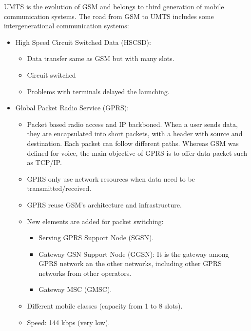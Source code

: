 \documentclass[../main.tex]{subfiles}
\begin{document}
UMTS is the evolution of GSM and belongs to third generation of mobile communication systems. The road from GSM to UMTS includes some intergenerational communication systems:
\begin{itemize}
	\item {
		High Speed Circuit Switched Data (HSCSD):
		\begin{itemize}
			\item Data transfer same as GSM but with many slots.
			\item Circuit switched
			\item Problems with terminals delayed the launching.
		\end{itemize}
	}
	\item {
		Global Packet Radio Service (GPRS):
		\begin{itemize}
			\item Packet based radio access and IP backboned. When a user sends data, they are encapsulated into short packets, with a header with source and destination. Each packet can follow different paths. Whereas GSM was defined for voice, the main objective of GPRS is to offer data packet such as TCP/IP.
			\item GPRS only use network resources when data need to be transmitted/received.
			\item GPRS reuse GSM’s architecture and infrastructure.
			\item {
				New elements are added for packet switching:
				\begin{itemize}
					\item Serving GPRS Support Node (SGSN).
					\item Gateway GSN Support Node (GGSN): It is the gateway among GPRS network an the other networks, including other GPRS networks from other operators.
					\item Gateway MSC (GMSC).
				\end{itemize}
			}
			\item Different mobile classes (capacity from 1 to 8 slots).
			\item Speed: 144 kbps (very low).
		\end{itemize}

}
\end{itemize}
\end{document}
